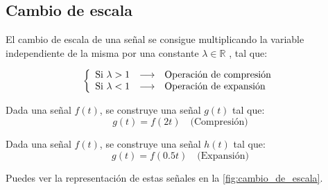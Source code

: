 \documentclass[a4paper]{book}
\begin{document}
\subsection{Cambio de escala}

El cambio de escala de una señal se consigue multiplicando la variable independiente de la misma por una constante $\lambda \in \mathbb{R}$ , tal que:

\[\left\{ \begin{array}{l c l}
		\textrm{Si } \lambda > 1 & \longrightarrow & \textrm{Operación de compresión} \\
		\textrm{Si } \lambda < 1 & \longrightarrow & \textrm{Operación de expansión}
	\end{array} \right.
\]

\begin{ejemplo}
	Dada una señal $f(t)$, se construye una señal $g(t)$ tal que: \[g(t) = f(2t) \quad \textrm{(Compresión)} \]
\end{ejemplo}

\begin{ejemplo}
	Dada una señal $f(t)$, se construye una señal $h(t)$ tal que: \[g(t) = f(0.5t) \quad \textrm{(Expansión)}\]
\end{ejemplo}

Puedes ver la representación de estas señales en la \autoref{fig:cambio_de_escala}.
\end{document}
